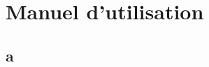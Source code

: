 	
	\part{Manuel d'utilisation}
	
	\setcounter{chapter}{0} %
	\setcounter{section}{0} %
	
	\renewcommand*{\theHchapter}{\thepart.\thechapter}
	\chapter{a}